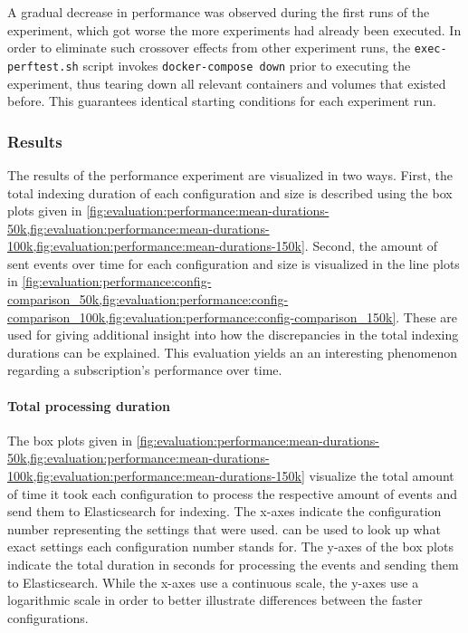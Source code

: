A gradual decrease in performance was observed during the first runs of the experiment, which got worse the more experiments had already been executed.
In order to eliminate such crossover effects from other experiment runs, the \texttt{exec-perftest.sh} script invokes \texttt{docker-compose down} prior to executing the experiment, thus tearing down all relevant containers and volumes that existed before.
This guarantees identical starting conditions for each experiment run.

\subsubsection{Results}

The results of the performance experiment are visualized in two ways.
First, the total indexing duration of each configuration and size is described using the box plots given in \cref{fig:evaluation:performance:mean-durations-50k,fig:evaluation:performance:mean-durations-100k,fig:evaluation:performance:mean-durations-150k}.
Second, the amount of sent events over time for each configuration and size is visualized in the line plots in \cref{fig:evaluation:performance:config-comparison_50k,fig:evaluation:performance:config-comparison_100k,fig:evaluation:performance:config-comparison_150k}.
These are used for giving additional insight into how the discrepancies in the total indexing durations can be explained.
This evaluation yields an an interesting phenomenon regarding a subscription's performance over time.

\paragraph{Total processing duration}

The box plots given in \cref{fig:evaluation:performance:mean-durations-50k,fig:evaluation:performance:mean-durations-100k,fig:evaluation:performance:mean-durations-150k} visualize the total amount of time it took each configuration to process the respective amount of events and send them to Elasticsearch for indexing.
The x-axes indicate the configuration number representing the settings that were used.
 can be used to look up what exact settings each configuration number stands for.
The y-axes of the box plots indicate the total duration in seconds for processing the events and sending them to Elasticsearch.
While the x-axes use a continuous scale, the y-axes use a logarithmic scale in order to better illustrate differences between the faster configurations.

